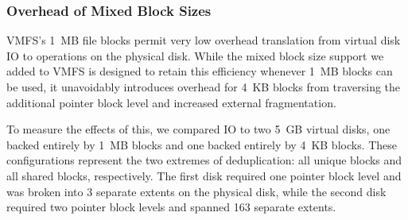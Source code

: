 \subsubsection{Overhead of Mixed Block Sizes}
\label{sec:eval-mixed}

VMFS's 1~MB file blocks permit very low overhead translation from
virtual disk IO to operations on the physical disk.  While the mixed
block size support we added to VMFS is designed to
retain this efficiency whenever 1~MB blocks can be used, it
unavoidably introduces overhead for 4~KB blocks from traversing the
additional pointer block level and increased external
fragmentation.

To measure the effects of this, we compared IO to two 5~GB virtual
disks, one backed entirely by 1~MB blocks and one backed entirely by
4~KB blocks.  These configurations represent the two extremes of
deduplication: all unique blocks and all shared blocks, respectively.
The first disk required one pointer block level and was broken into 3
separate extents on the physical disk, while the second disk required
two pointer block levels and spanned 163 separate extents.

